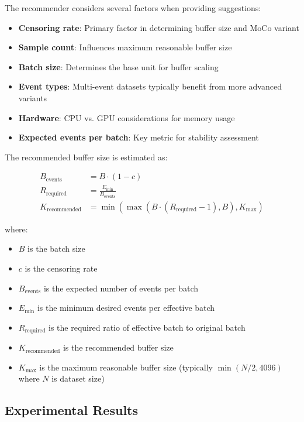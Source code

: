 The recommender considers several factors when providing suggestions:

\begin{itemize}
\item \textbf{Censoring rate}: Primary factor in determining buffer size and MoCo variant
\item \textbf{Sample count}: Influences maximum reasonable buffer size
\item \textbf{Batch size}: Determines the base unit for buffer scaling
\item \textbf{Event types}: Multi-event datasets typically benefit from more advanced variants
\item \textbf{Hardware}: CPU vs. GPU considerations for memory usage
\item \textbf{Expected events per batch}: Key metric for stability assessment
\end{itemize}

\begin{equationbox}[title=Buffer Size Estimation]
  The recommended buffer size is estimated as:
  
  \begin{align}
    B_{\text{events}} &= B \cdot (1 - c)\\
    R_{\text{required}} &= \frac{E_{\min}}{B_{\text{events}}}\\
    K_{\text{recommended}} &= \min(\max(B \cdot (R_{\text{required}} - 1), B), K_{\max})
  \end{align}
  
  where:
  \begin{itemize}
  \item $B$ is the batch size
  \item $c$ is the censoring rate
  \item $B_{\text{events}}$ is the expected number of events per batch
  \item $E_{\min}$ is the minimum desired events per effective batch
  \item $R_{\text{required}}$ is the required ratio of effective batch to original batch
  \item $K_{\text{recommended}}$ is the recommended buffer size
  \item $K_{\max}$ is the maximum reasonable buffer size (typically $\min(N/2, 4096)$ where $N$ is dataset size)
  \end{itemize}
\end{equationbox}

\subsection{Experimental Results}

